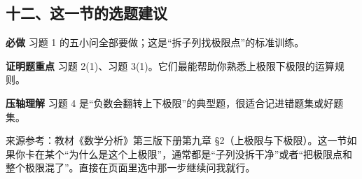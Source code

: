 \subsection*{十二、这一节的选题建议}

\begin{conceptbox}
\textbf{必做}
习题 1 的五小问全部要做；这是“拆子列找极限点”的标准训练。
\end{conceptbox}

\begin{conceptbox}
\textbf{证明题重点}
习题 2(1)、习题 3(1)。它们最能帮助你熟悉上极限下极限的运算规则。
\end{conceptbox}

\begin{conceptbox}
\textbf{压轴理解}
习题 4 是“负数会翻转上下极限”的典型题，很适合记进错题集或好题集。
\end{conceptbox}

来源参考：教材《数学分析》第三版下册第九章 §2（上极限与下极限）。这一节如果你卡在某个“为什么是这个上极限”，通常都是“子列没拆干净”或者“把极限点和整个极限混了”。直接在页面里选中那一步继续问我就行。

